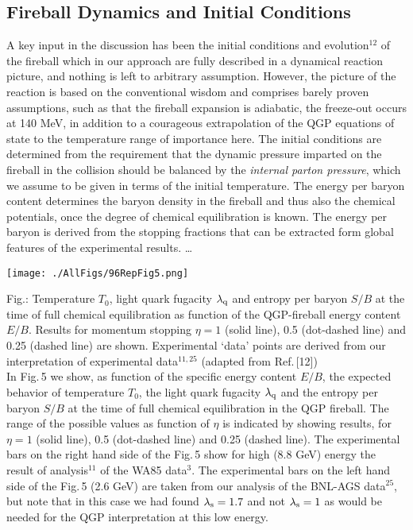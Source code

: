 \begin{mdframed}[linecolor=gray,roundcorner=12pt,backgroundcolor=Dandelion!15,linewidth=1pt,leftmargin=0cm,rightmargin=0cm,topline=true,bottomline=true,skipabove=12pt]
\subsection*{Fireball Dynamics and Initial Conditions}
A key input in the discussion has been the initial conditions and evolution$^{12}$ of  the fireball which in our approach are fully described in a dynamical reaction picture, and nothing is left to arbitrary assumption. However, the picture of the reaction is based on the conventional wisdom and comprises barely proven assumptions, such as that the fireball expansion is adiabatic, the freeze-out occurs at 140 MeV, in addition to a courageous extrapolation of the QGP equations of state to the temperature range of importance here. The initial conditions are determined from the requirement that the dynamic pressure imparted on the fireball in the collision should be balanced by the {\it internal parton pressure}, which we assume to be given in terms of the initial temperature. The energy per baryon content determines the baryon density in the fireball and thus also the chemical potentials, once the degree of chemical equilibration is  known. The energy per baryon is derived from the stopping fractions that can be extracted form global features of the experimental results. \ldots
 

\centerline{
\texttt{[image: ./AllFigs/96RepFig5.png]} 
}%
\noindent Fig.:  Temperature $T_0$, light quark fugacity $\lambda_{\rm q}$ and entropy per baryon $S/B$ at the time of full chemical equilibration  as function of the QGP-fireball energy content $E/B$. Results for momentum stopping $\eta=1$ (solid line), 0.5 (dot-dashed line) and 0.25 (dashed line) are shown. Experimental `data' points are derived from our interpretation of experimental data$^{11,25}$ (adapted from Ref.\,[12])\\

In  Fig.\,5 we show, as function of the specific energy content $E/B$,  the expected behavior of temperature $T_0$,  the light quark fugacity $\lambda_{\rm q}$ and the entropy per baryon $S/B$ at the time of full chemical equilibration in the QGP fireball.  The range of the possible values as function of $\eta$ is indicated by showing  results, for $\eta=1$ (solid line), 0.5 (dot-dashed line) and 0.25 (dashed line). The experimental bars on the right hand side  of the  Fig.\,5 show for high (8.8 GeV) energy the result of analysis$^{11}$ of the WA85 data$^{3}$. The experimental bars  on the left hand side of the  Fig.\,5 (2.6 GeV) are taken from our analysis of the BNL-AGS data$^{25}$, but note that in this case we had found $\lambda_{\rm s}=1.7$ and not $\lambda_{\rm s}=1$ as would be needed for the QGP interpretation at this low energy. 


\end{mdframed}
